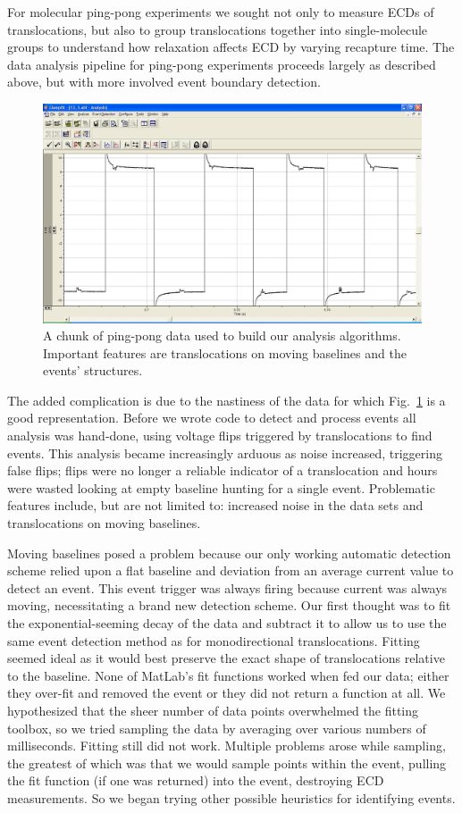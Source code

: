\documentclass[aps,prl,preprint,groupedaddress]{revtex4}
\begin{document}
For molecular ping-pong experiments we sought not only to measure ECDs of translocations, but also to group translocations together into single-molecule groups to understand how relaxation affects ECD by varying recapture time.
The data analysis pipeline for ping-pong experiments proceeds largely as described above, but with more involved event boundary detection.
\begin{figure}
\centering
\includegraphics[width=1\textwidth]{figures/good-ping-pong}
\caption{A chunk of ping-pong data used to build our analysis algorithms.
Important features are translocations on moving baselines and the events' structures.}
\label{fig:good-ping-pong}
\end{figure}
The added complication is due to the nastiness of the data for which Fig.~\ref{fig:good-ping-pong} is a good representation.
Before we wrote code to detect and process events all analysis was hand-done, using voltage flips triggered by translocations to find events.
This analysis became increasingly arduous as noise increased, triggering false flips; flips were no longer a reliable indicator of a translocation and hours were wasted looking at empty baseline hunting for a single event.
Problematic features include, but are not limited to: increased noise in the data sets and translocations on moving baselines.

Moving baselines posed a problem because our only working automatic detection scheme relied upon a flat baseline and deviation from an average current value to detect an event.
This event trigger was always firing because current was always moving, necessitating a brand new detection scheme.
Our first thought was to fit the exponential-seeming decay of the data and subtract it to allow us to use the same event detection method as for monodirectional translocations.
Fitting seemed ideal as it would best preserve the exact shape of translocations relative to the baseline.
None of MatLab's fit functions worked when fed our data; either they over-fit and removed the event or they did not return a function at all.
We hypothesized that the sheer number of data points overwhelmed the fitting toolbox, so we tried sampling the data by averaging over various numbers of milliseconds.
Fitting still did not work.
Multiple problems arose while sampling, the greatest of which was that we would sample points within the event, pulling the fit function (if one was returned) into the event, destroying ECD measurements.
So we began trying other possible heuristics for identifying events.
\end{document}
